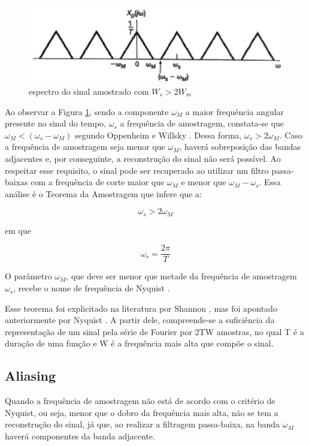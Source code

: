 \begin{figure}[h]
	\centering
    \includegraphics[scale=0.5]{figuras/fig03.eps}
	\caption{espectro do sinal amostrado com $W_s > 2W_m$ \cite{oppenheim2010sinais}}
	\label{fig03}
\end{figure}

Ao observar a Figura \ref{fig03}, sendo a componente $\omega_M$ a maior frequência angular presente no sinal do tempo, $\omega_s$ a frequência de amostragem, constata-se que $\omega_M < (\omega_s - \omega_M)$ segundo Oppenheim e Willsky \cite{oppenheim2010sinais}. Dessa forma, $\omega_s > 2\omega_M$. Caso a frequência de amostragem seja menor que $\omega_M$, haverá sobreposição das bandas adjacentes e, por conseguinte, a reconstrução do sinal não será possível. Ao respeitar esse requisito, o sinal pode ser recuperado ao utilizar um filtro passa-baixas com a frequência de corte maior que $\omega_M$ e menor que $\omega_M - \omega_s$.
Essa análise é o Teorema da Amostragem que infere que a:

\begin{equation} \label{eq:01}
\omega_s > 2\omega_M
\end{equation}

em que

\begin{equation} \label{eq:02}
\omega_s = \frac{2\pi}{T}
\end{equation}

O parâmetro $\omega_M$, que deve ser menor que metade da frequência de amostragem $\omega_s$, recebe o nome de frequência de Nyquist \cite{oppenheim2010sinais}.
\par
Esse teorema foi explicitado na literatura por Shannon \cite{Shannon}, mas foi apontado anteriormente por Nyquist \cite{nyquist}. A partir dele, compreende-se a suficiência da representação de um sinal pela série de Fourier por 2TW amostras, no qual T é a duração de uma função e W é a frequência mais alta que compõe o sinal.

\subsection{Aliasing}
Quando a frequência de amostragem não está de acordo com o critério de Nyquist, ou seja, menor que o dobro da frequência mais alta, não se tem a reconstrução do sinal, já que, ao realizar a filtragem passa-baixa, na banda $\omega_M$ haverá componentes da banda adjacente.

